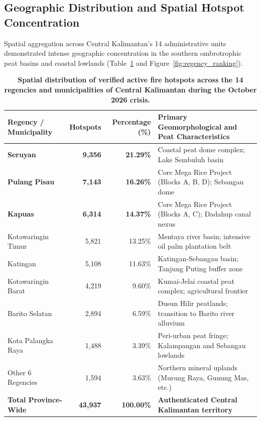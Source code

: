 \subsection{Geographic Distribution and Spatial Hotspot Concentration}
\label{subsec:results_geography}

Spatial aggregation across Central Kalimantan's 14 administrative units demonstrated intense geographic concentration in the southern ombrotrophic peat basins and coastal lowlands (Table~\ref{tab:regency_distribution} and Figure~\ref{fig:regency_ranking}).

\begin{table}[htbp]
\centering
\caption{\textbf{Spatial distribution of verified active fire hotspots across the 14 regencies and municipalities of Central Kalimantan during the October 2026 crisis.}}
\label{tab:regency_distribution}
\small
\begin{tabular}{lrrl}
\toprule
\textbf{Regency / Municipality} & \textbf{Hotspots} & \textbf{Percentage (\%)} & \textbf{Primary Geomorphological and Peat Characteristics} \\
\midrule
\textbf{Seruyan} & \textbf{9,356} & \textbf{21.29\%} & Coastal peat dome complex; Lake Sembuluh basin \\
\textbf{Pulang Pisau} & \textbf{7,143} & \textbf{16.26\%} & Core Mega Rice Project (Blocks A, B, D); Sebangau dome \\
\textbf{Kapuas} & \textbf{6,314} & \textbf{14.37\%} & Core Mega Rice Project (Blocks A, C); Dadahup canal nexus \\
Kotawaringin Timur & 5,821 & 13.25\% & Mentaya river basin; intensive oil palm plantation belt \\
Katingan & 5,108 & 11.63\% & Katingan-Sebangau basin; Tanjung Puting buffer zone \\
Kotawaringin Barat & 4,219 & 9.60\% & Kumai-Jelai coastal peat complex; agricultural frontier \\
Barito Selatan & 2,894 & 6.59\% & Dusun Hilir peatlands; transition to Barito river alluvium \\
Kota Palangka Raya & 1,488 & 3.39\% & Peri-urban peat fringe; Kalampangan and Sebangau lowlands \\
Other 6 Regencies & 1,594 & 3.63\% & Northern mineral uplands (Murung Raya, Gunung Mas, etc.) \\
\midrule
\textbf{Total Province-Wide} & \textbf{43,937} & \textbf{100.00\%} & \textbf{Authenticated Central Kalimantan territory} \\
\bottomrule
\end{tabular}
\end{table}

